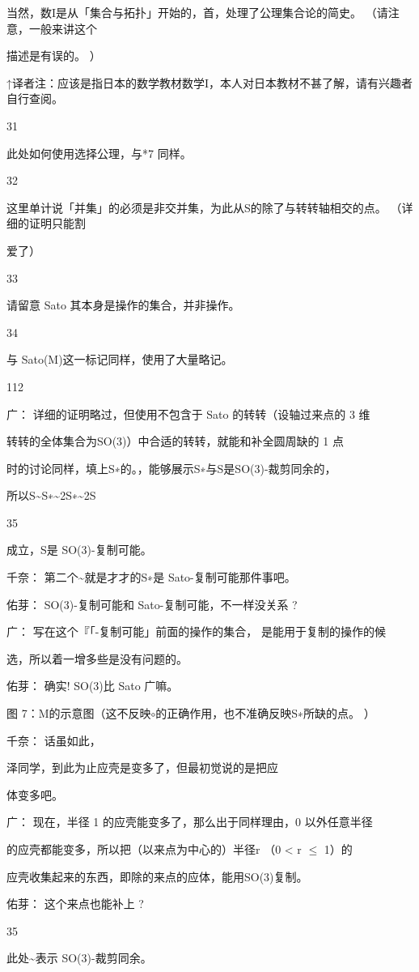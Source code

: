 当然，数I是从「集合与拓扑」开始的，首，处理了公理集合论的简史。 （请注意，一般来讲这个\par
描述是有误的。 ）\par
↑译者注：应该是指日本的数学教材数学I，本人对日本教材不甚了解，请有兴趣者自行查阅。\par
31\par
此处如何使用选择公理，与*7 同样。\par
32\par
这里单计说「并集」的必须是非交并集，为此从S的除了与转转轴相交的点。 （详细的证明只能割\par
爱了）\par
33\par
请留意 Sato 其本身是操作的集合，并非操作。\par
34\par
与 Sato(M)这一标记同样，使用了大量略记。\par

112\par
广： 详细的证明略过，但使用不包含于 Sato 的转转（设轴过来点的 3 维\par
转转的全体集合为SO(3)）中合适的转转，就能和补全圆周缺的 1 点\par
时的讨论同样，填上S∗的。，能够展示S∗与S是SO(3)-裁剪同余的，\par
所以S\textasciitilde{}S∗\textasciitilde{}2S∗\textasciitilde{}2S\par
35\par
成立，S是 SO(3)-复制可能。\par
千奈： 第二个\textasciitilde{}就是才才的S∗是 Sato-复制可能那件事吧。\par
佑芽： SO(3)-复制可能和 Sato-复制可能，不一样没关系 ?\par
广： 写在这个『「-复制可能」前面的操作的集合， 是能用于复制的操作的候\par
选，所以着一增多些是没有问题的。\par
佑芽： 确实! SO(3)比 Sato 广嘛。\par
图 7：M的示意图（这不反映$\circ$的正确作用，也不准确反映S∗所缺的点。 ）\par
千奈： 话虽如此，\par
泽同学，到此为止应壳是变多了，但最初觉说的是把应\par
体变多吧。\par
广： 现在，半径 1 的应壳能变多了，那么出于同样理由，0 以外任意半径\par
的应壳都能变多，所以把（以来点为中心的）半径r （0 < r $\leq$ 1）的\par
应壳收集起来的东西，即除的来点的应体，能用SO(3)复制。\par
佑芽： 这个来点也能补上 ?\par
35\par
此处\textasciitilde{}表示 SO(3)-裁剪同余。\par

